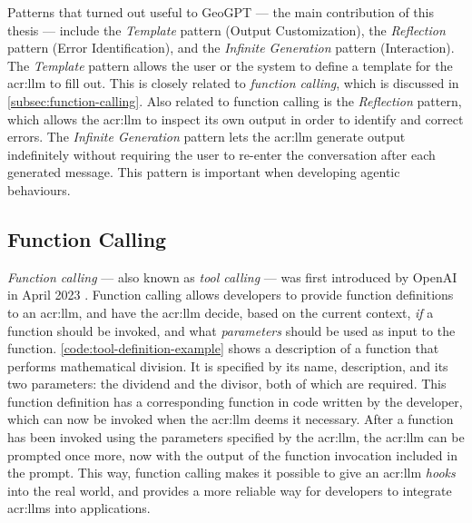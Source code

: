 Patterns that turned out useful to GeoGPT --- the main contribution of this thesis --- include the \textit{Template} pattern (Output Customization), the \textit{Reflection} pattern (Error Identification), and the \textit{Infinite Generation} pattern (Interaction). The \textit{Template} pattern allows the user or the system to define a template for the \acrshort{acr:llm} to fill out. This is closely related to \textit{function calling}, which is discussed in \autoref{subsec:function-calling}. Also related to function calling is the \textit{Reflection} pattern, which allows the \acrshort{acr:llm} to inspect its own output in order to identify and correct errors. The \textit{Infinite Generation} pattern lets the \acrshort{acr:llm} generate output indefinitely without requiring the user to re-enter the conversation after each generated message. This pattern is important when developing agentic behaviours.


\subsection[Function Calling LLMs]{Function Calling }
\label{subsec:function-calling}

\textit{Function calling} --- also known as \textit{tool calling} --- was first introduced by OpenAI in April 2023 \citep{eletiFunctionCallingOther2023}. Function calling allows developers to provide function definitions to an \gls{acr:llm}, and have the \gls{acr:llm} decide, based on the current context, \textit{if} a function should be invoked, and what \textit{parameters} should be used as input to the function. \autoref{code:tool-definition-example} shows a description of a function that performs mathematical division. It is specified by its name, description, and its two parameters: the dividend and the divisor, both of which are required. This function definition has a corresponding function in code written by the developer, which can now be invoked when the \acrshort{acr:llm} deems it necessary. After a function has been invoked using the parameters specified by the \acrshort{acr:llm}, the \acrshort{acr:llm} can be prompted once more, now with the output of the function invocation included in the prompt. This way, function calling makes it possible to give an \gls{acr:llm} \textit{hooks} into the real world, and provides a more reliable way for developers to integrate \glspl{acr:llm} into applications.

